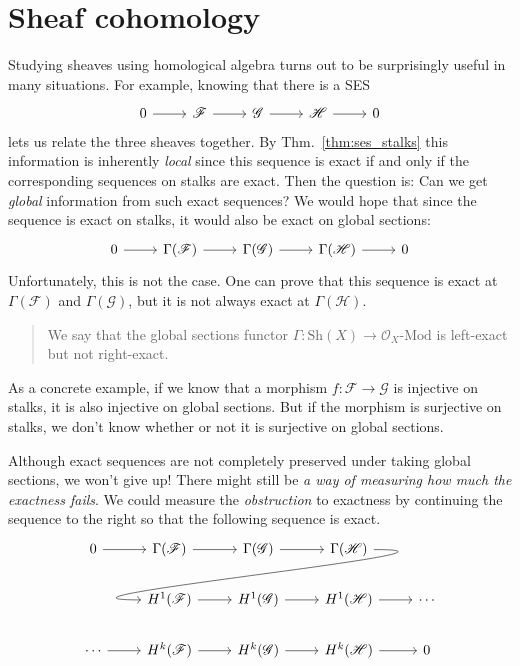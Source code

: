 \documentclass[12pt]{article}
\begin{document}
\section{Sheaf cohomology}
Studying sheaves using homological algebra turns out to be surprisingly
useful in many situations. For example, knowing that there is a SES
\[
  \begin{tikzcd}
    0 \arrow{r} & \mathcal{F} \arrow{r} & \mathcal{G} \arrow{r} &
    \mathcal{H} \arrow{r} & 0
  \end{tikzcd}
\]
lets us relate the three sheaves together. By Thm.~\ref{thm:ses_stalks}
this information is inherently \emph{local} since this sequence is exact
if and only if the corresponding sequences on stalks are exact.
Then the question is: Can we get \emph{global} information from
such exact sequences? We would hope that since the sequence is exact
on stalks, it would also be exact on global sections:
\[
  \begin{tikzcd}
    0 \arrow{r} & \Gamma(\mathcal{F}) \arrow{r} & \Gamma(\mathcal{G})
    \arrow{r} & \Gamma(\mathcal{H}) \arrow{r} & 0
  \end{tikzcd}
\]
Unfortunately, this is not the case. One can prove that this sequence
is exact at $\Gamma(\mathcal{F})$ and $\Gamma(\mathcal{G})$, but it
is not always exact at $\Gamma(\mathcal{H})$.

\begin{quote}
  We say that the global sections functor $\Gamma: \text{Sh}(X)\to \mathcal{O}_{X}\text{-Mod}$ is left-exact but not right-exact.
\end{quote}

As a concrete example, if we know that a morphism $f: \mathcal{F}
\to\mathcal{G}$ is injective on stalks, it is also injective on
global sections. But if the morphism is surjective on stalks, we don't
know whether or not it is surjective on global sections.

Although exact sequences are not completely preserved under taking
global sections, we won't give up! There might still be \emph{a way of
measuring how much the exactness fails}. We could measure the
\emph{obstruction} to exactness by continuing the sequence to the right
so that the following sequence is exact.
\[
  \begin{tikzcd}
    0 \arrow{r} & \Gamma(\mathcal{F}) \arrow{r} & \Gamma(\mathcal{G})
    \arrow{r} & \Gamma(\mathcal{H})
    \arrow[out=0, in=180, looseness=1.5, overlay]{dll} & \\
     & H^{1}(\mathcal{F}) \arrow{r} & H^{1}(\mathcal{G})
    \arrow{r} & H^{1}(\mathcal{H}) \arrow{r} & \cdots \\
    \cdots \arrow{r}& H^{k}(\mathcal{F}) \arrow{r} & H^{k}(\mathcal{G})
    \arrow{r} & H^{k}(\mathcal{H}) \arrow{r} & 0
  \end{tikzcd}
\]
\end{document}
